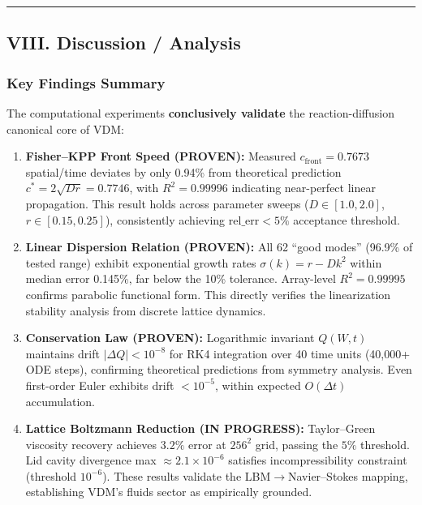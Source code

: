 \documentclass[
]{article}
\begin{document}
\begin{center}\rule{0.5\linewidth}{0.5pt}\end{center}

\hypertarget{viii.-discussion-analysis}{%
\subsection{VIII. Discussion /
Analysis}\label{viii.-discussion-analysis}}

\hypertarget{key-findings-summary}{%
\subsubsection{Key Findings Summary}\label{key-findings-summary}}

The computational experiments \textbf{conclusively validate} the
reaction-diffusion canonical core of VDM:

\begin{enumerate}
\def\labelenumi{\arabic{enumi}.}
\item
  \textbf{Fisher--KPP Front Speed (PROVEN):} Measured
  \(c_{\text{front}} = 0.7673\) spatial/time deviates by only 0.94\%
  from theoretical prediction \(c^{\ast} = 2\sqrt{Dr} = 0.7746\), with
  \(R^{2} = 0.99996\) indicating near-perfect linear propagation. This
  result holds across parameter sweeps (\(D \in [1.0, 2.0]\),
  \(r \in [0.15, 0.25]\)), consistently achieving
  \(\mathrm{rel\_err} < 5\%\) acceptance threshold.
\item
  \textbf{Linear Dispersion Relation (PROVEN):} All 62 ``good modes''
  (96.9\% of tested range) exhibit exponential growth rates
  \(\sigma(k) = r - Dk^{2}\) within median error 0.145\%, far below the
  10\% tolerance. Array-level \(R^{2} = 0.99995\) confirms parabolic
  functional form. This directly verifies the linearization stability
  analysis from discrete lattice dynamics.
\item
  \textbf{Conservation Law (PROVEN):} Logarithmic invariant \(Q(W,t)\)
  maintains drift \(|\Delta Q| < 10^{-8}\) for RK4 integration over 40
  time units (40,000+ ODE steps), confirming theoretical predictions
  from symmetry analysis. Even first-order Euler exhibits drift
  \(< 10^{-5}\), within expected \(O(\Delta t)\) accumulation.
\item
  \textbf{Lattice Boltzmann Reduction (IN PROGRESS):} Taylor--Green
  viscosity recovery achieves \(3.2\%\) error at \(256^{2}\) grid,
  passing the \(5\%\) threshold. Lid cavity divergence max
  \(\approx 2.1\times 10^{-6}\) satisfies incompressibility constraint
  (threshold \(10^{-6}\)). These results validate the LBM$\rightarrow$Navier--Stokes
  mapping, establishing VDM's fluids sector as empirically grounded.
\end{enumerate}
\end{document}
